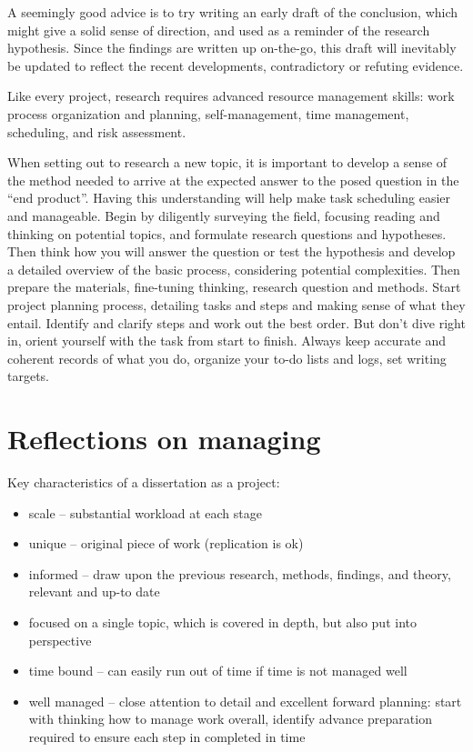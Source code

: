 \documentclass[10pt,a4paper,twocolumn]{article}
\begin{document}
A seemingly good advice is to try writing an early draft of the conclusion, which might
give a solid sense of direction, and used as a reminder of the research hypothesis. Since
the findings are written up on-the-go, this draft will inevitably be updated to reflect the
recent developments, contradictory or refuting evidence.

Like every project, research requires advanced resource management skills: work process
organization and planning, self-management, time management, scheduling, and risk assessment.

When setting out to research a new topic, it is important to develop a sense of the method
needed to arrive at the expected answer to the posed question in the ``end product''. Having
this understanding will help make task scheduling easier and manageable.
%
Begin by diligently surveying the field, focusing reading and thinking on potential topics,
and formulate research questions and hypotheses. Then think how you will answer the question
or test the hypothesis and develop a detailed overview of the basic process, considering
potential complexities.
%
Then prepare the materials, fine-tuning thinking, research question and methods. Start project
planning process, detailing tasks and steps and making sense of what they entail. Identify and
clarify steps and work out the best order. But don't dive right in, orient yourself with the
task from start to finish. Always keep accurate and coherent records of what you do, organize
your to-do lists and logs, set writing targets.


\section{Reflections on managing} %
\label{sec:reflections_on_managing}

Key characteristics of a dissertation as a project:
\begin{itemize}
  \item scale -- substantial workload at each stage
  \item unique -- original piece of work (replication is ok)
  \item informed -- draw upon the previous research, methods, findings, and theory, relevant
  and up-to date
  \item focused on a single topic, which is covered in depth, but also put into perspective
  \item time bound -- can easily run out of time if time is not managed well
  \item well managed -- close attention to detail and excellent forward planning: start with
  thinking how to manage work overall, identify advance preparation required to ensure each
  step in completed in time
\end{itemize}
\end{document}
